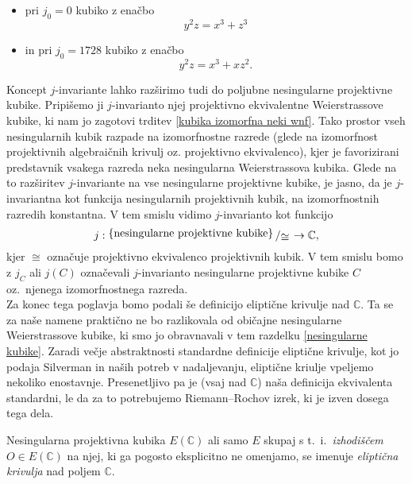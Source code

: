 \documentclass[mat1]{fmfdelo}
\newcommand{\C}{\mathbb C}
\newcommand{\bigslant}[2]{{\raisebox{.2em}{$#1$}\left/\raisebox{-.2em}{$#2$}\right.}}
\theoremstyle{definition}
\begin{document}
\begin{itemize}
    \item pri $j_0 = 0$ kubiko z enačbo 
    \[
        y^2z = x^3 + z^3
    \]
    \item in pri $j_0 = 1728$ kubiko z enačbo
    \[
        y^2z = x^3 + xz^2.
    \]
\end{itemize}

Koncept $j$-invariante lahko razširimo tudi do poljubne nesingularne projektivne kubike. Pripišemo ji $j$-invarianto njej projektivno ekvivalentne Weierstrassove kubike, ki nam jo zagotovi trditev \ref{kubika izomorfna neki wnf}. Tako prostor vseh nesingularnih kubik razpade na izomorfnostne razrede (glede na izomorfnost projektivnih algebraičnih krivulj oz. projektivno ekvivalenco), kjer je favorizirani predstavnik vsakega razreda neka nesingularna Weierstrassova kubika. Glede na to razširitev $j$-invariante na vse nesingularne projektivne kubike, je jasno, da je $j$-invariantna kot funkcija nesingularnih projektivnih kubik, na izomorfnostnih razredih konstantna. V tem smislu vidimo $j$-invarianto kot funkcijo
\[
    j: \bigslant{\{\text{nesingularne projektivne kubike}\}}{\cong} \to \C,
\]
kjer $\cong$ označuje projektivno ekvivalenco projektivnih kubik. V tem smislu bomo z $j_C$ ali $j(C)$ označevali $j$-invarianto nesingularne projektivne kubike $C$ oz.\ njenega izomorfnostnega razreda.
\\

Za konec tega poglavja bomo podali še definicijo eliptične krivulje nad $\C$. Ta se za naše namene praktično ne bo razlikovala od običajne nesingularne Weierstrassove kubike, ki smo jo obravnavali v tem razdelku \ref{nesingularne kubike}. Zaradi večje abstraktnosti standardne definicije eliptične krivulje, kot jo podaja Silverman \cite[III. \S 3.]{Silverman} in naših potreb v nadaljevanju, eliptične kriulje vpeljemo nekoliko enostavnje. Presenetljivo pa je (vsaj nad $\C$) naša definicija ekvivalenta standardni, le da za to potrebujemo Riemann--Rochov izrek, ki je izven dosega tega dela.

\begin{definicija}
    Nesingularna projektivna kubika $E(\C)$ ali samo $E$ skupaj s t.~i.\ \emph{izhodiščem} $O \in E(\C)$ na njej, ki ga pogosto eksplicitno ne omenjamo, se imenuje \emph{eliptična krivulja} nad poljem $\C$. 
\end{definicija}
\end{document}
